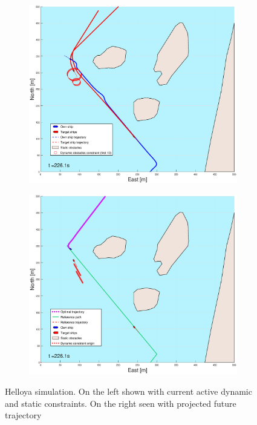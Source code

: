 \begin{figure}[ht]
\begin{subfigure}[b]{0.499\textwidth}
    \end{subfigure}
    \hfill
    \\
    \begin{subfigure}[b]{0.49\textwidth}
        \centering
        \includegraphics[width=\textwidth]{Images/Figures/Helloya/_Simple_1fig1_time=226}
    \end{subfigure}
    \hfill
    \begin{subfigure}[b]{0.499\textwidth}
        \centering
        \includegraphics[width=\textwidth]{Images/Figures/Helloya/_Simple_1fig999_time=226}
    \end{subfigure}
    \hfill
    \caption{Helloya simulation. On the left shown with current active dynamic and static constraints. On the right seen with projected future trajectory}
\end{figure}

